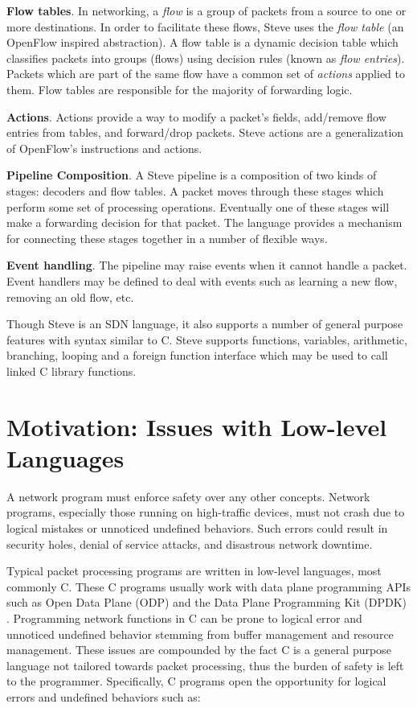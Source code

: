 \textbf{Flow tables}. 
In networking, a \emph{flow} is a group of packets from a source to one or more 
destinations. In order to facilitate these flows, Steve uses the
\emph{flow table} (an OpenFlow inspired abstraction). 
A flow table is a dynamic
decision table which classifies packets into groups (flows) using
decision rules (known as \emph{flow entries}).
Packets which are part of the same flow have a common set of \emph{actions}
applied to them.
Flow tables are responsible for the majority of forwarding logic.

\textbf{Actions}. Actions provide a way to modify a packet's fields, add/remove
flow entries from tables, and forward/drop packets. Steve actions are a generalization
of OpenFlow's instructions and actions.

\textbf{Pipeline Composition}. A Steve pipeline is a composition of two kinds of stages:
decoders and flow tables.
A packet moves through these stages which perform some set of processing operations.
Eventually one of these stages will make a forwarding decision for that packet.
The language provides a mechanism for connecting these
stages together in a number of flexible ways.

\textbf{Event handling}. The pipeline may raise events when it cannot handle a
packet. Event handlers may be defined to deal with events such as learning a new
flow, removing an old flow, etc.

Though Steve is an SDN language, it also supports a number of general purpose
features with syntax similar to C. 
Steve supports functions, variables, arithmetic, branching, 
looping and a foreign function interface which may be used to call linked C 
library functions.

\section{Motivation: Issues with Low-level Languages}

A network program must enforce safety over any other concepts.
Network programs, especially those running on high-traffic devices, must not
crash due to logical mistakes or unnoticed undefined behaviors.
Such errors could result in security holes, denial of service attacks, and
disastrous network downtime.

Typical packet processing programs are written in low-level languages, most
commonly C. These C programs usually work with data plane programming APIs such
as Open Data Plane (ODP) \cite{odp_webpage} and the Data Plane Programming Kit
(DPDK) \cite{dpdk_webpage}. Programming network functions in C can be prone
to logical error and unnoticed undefined behavior stemming from buffer management
and resource management. These issues are compounded by the fact C is a general
purpose language not tailored towards packet processing, thus the burden of safety
is left to the programmer.
Specifically, C programs open the opportunity for logical errors and undefined
behaviors such as:

